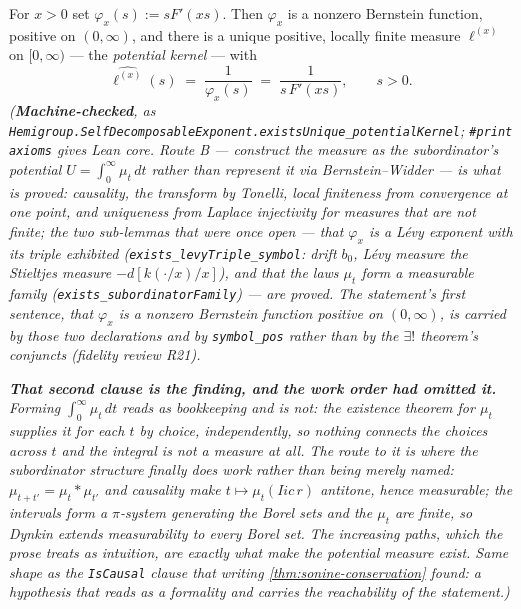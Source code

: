 \begin{lemma}\label{lem:potential-kernel}
\leanok
For $x > 0$ set $\varphi_x(s) := s F'(xs)$. Then $\varphi_x$ is a nonzero Bernstein function,
positive on $(0,\infty)$, and there is a unique positive, locally finite measure $\ell^{(x)}$
on $[0,\infty)$ --- the \emph{potential kernel} --- with
\[
  \widehat{\ell^{(x)}}(s) \;=\; \frac{1}{\varphi_x(s)} \;=\; \frac{1}{s\,F'(xs)}, \qquad s > 0.
\]
\statusT\quad\emph{(\textbf{Machine-checked}, as
\texttt{Hemigroup.SelfDecomposableExponent.existsUnique\_potentialKernel}; \texttt{\#print axioms}
gives Lean core. Route B --- construct the measure as the
subordinator's potential $U = \int_0^\infty \mu_t\,dt$ rather than represent it via
Bernstein--Widder --- is what is proved: causality, the transform by Tonelli, local finiteness
from convergence at one point, and uniqueness from Laplace injectivity for measures that are not
finite; the two sub-lemmas that were once open --- that $\varphi_x$ is a L\'evy exponent with its
triple exhibited (\texttt{exists\_levyTriple\_symbol}: drift $b_0$, L\'evy measure the Stieltjes
measure $-d[k(\cdot/x)/x]$), and that the laws $\mu_t$ form a \emph{measurable} family
(\texttt{exists\_subordinatorFamily}) --- are proved. The statement's first sentence, that
$\varphi_x$ is a nonzero Bernstein function positive on $(0,\infty)$, is carried by those two
declarations and by \texttt{symbol\_pos} rather than by the $\exists!$ theorem's conjuncts
(fidelity review R21).}

\emph{\textbf{That second clause is the finding, and the work order had omitted it.} Forming
$\int_0^\infty \mu_t\,dt$ reads as bookkeeping and is not: the existence theorem for $\mu_t$ supplies it for each $t$
\emph{by choice, independently}, so nothing connects the choices across $t$ and the integral is
not a measure at all. The route to it is where the \emph{subordinator} structure finally does
work rather than being merely named: $\mu_{t+t'} = \mu_t * \mu_{t'}$ and causality make
$t \mapsto \mu_t(Iic\,r)$ antitone, hence measurable; the intervals form a $\pi$-system generating the
Borel sets and the $\mu_t$ are finite, so Dynkin extends measurability to every Borel set. The
increasing paths, which the prose treats as intuition, are exactly what make the potential
measure \emph{exist}. Same shape as the \texttt{IsCausal} clause that writing
\ref{thm:sonine-conservation} found: a hypothesis that reads as a formality and carries the
reachability of the statement.)}
\end{lemma}

